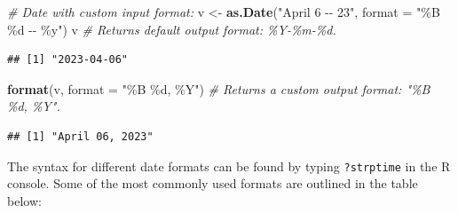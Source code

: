 \documentclass[
]{book}
\newenvironment{Shaded}{\begin{snugshade}}{\end{snugshade}}
\newcommand{\AttributeTok}[1]{\textcolor[rgb]{0.13,0.29,0.53}{#1}}
\newcommand{\CommentTok}[1]{\textcolor[rgb]{0.56,0.35,0.01}{\textit{#1}}}
\newcommand{\FunctionTok}[1]{\textcolor[rgb]{0.13,0.29,0.53}{\textbf{#1}}}
\newcommand{\NormalTok}[1]{#1}
\newcommand{\OtherTok}[1]{\textcolor[rgb]{0.56,0.35,0.01}{#1}}
\newcommand{\StringTok}[1]{\textcolor[rgb]{0.31,0.60,0.02}{#1}}
\begin{document}
\begin{Shaded}
\begin{Highlighting}[]
\CommentTok{\# Date with custom input format:}
\NormalTok{v }\OtherTok{\textless{}{-}} \FunctionTok{as.Date}\NormalTok{(}\StringTok{"April 6 {-}{-} 23"}\NormalTok{, }\AttributeTok{format =} \StringTok{"\%B \%d {-}{-} \%y"}\NormalTok{)}
\NormalTok{v  }\CommentTok{\# Returns default output format: \%Y{-}\%m{-}\%d.}
\end{Highlighting}
\end{Shaded}

\begin{verbatim}
## [1] "2023-04-06"
\end{verbatim}

\begin{Shaded}
\begin{Highlighting}[]
\FunctionTok{format}\NormalTok{(v, }\AttributeTok{format =} \StringTok{"\%B \%d, \%Y"}\NormalTok{)  }\CommentTok{\# Returns a custom output format: "\%B \%d, \%Y".}
\end{Highlighting}
\end{Shaded}

\begin{verbatim}
## [1] "April 06, 2023"
\end{verbatim}

The syntax for different date formats can be found by typing \texttt{?strptime} in the R console. Some of the most commonly used formats are outlined in the table below:
\end{document}
